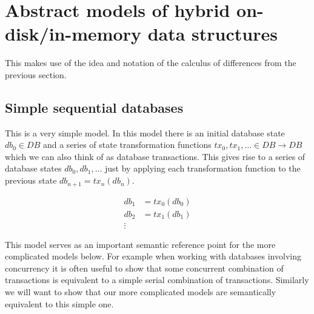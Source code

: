\documentclass[11pt,a4paper]{article}
\begin{document}
\section{Abstract models of hybrid on-disk/in-memory data structures}

This makes use of the idea and notation of the calculus of differences from
the previous section.

\subsection{Simple sequential databases}

This is a very simple model. In this model there is an initial database state
$\mathit{db}_0 \in \mathit{DB}$ and a series of state transformation functions
$\mathit{tx}_0, \mathit{tx}_1, \ldots \in \mathit{DB} \to \mathit{DB} $ which we can also think of as database
transactions. This gives rise to a series of database states
$\mathit{db}_0, \mathit{db}_1, \ldots$ just by applying each transformation
function to the previous state
$\mathit{db}_{n+1} = \mathit{tx}_n(\mathit{db}_n)$.

\begin{center}
\begin{align*}
 \mathit{db}_1 & = \mathit{tx}_0(\mathit{db}_0) \\
 \mathit{db}_2 & = \mathit{tx}_1(\mathit{db}_1) \\
 \vdots
\end{align*}
\end{center}
This model serves as an important semantic reference point for the more
complicated models below. For example when working with databases involving
concurrency it is often useful to show that some concurrent combination of
transactions is equivalent to a simple serial combination of transactions.
Similarly we will want to show that our more complicated models are
semantically equivalent to this simple one.
\end{document}
